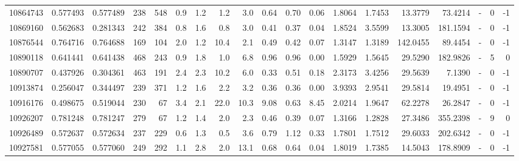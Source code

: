 \begin{tabular}{rrrrrrrrrrrrrrrrlrr}
  10864743 & 0.577493 &   0.577489 &  238 &  548 &      0.9 &      1.2 &     1.2 &      3.0 &       0.64 &        0.70 &        0.06 &  1.8064 &  1.7453 &   13.3779 &   73.4214 &             - &        0 &         -1 \\
  10869160 & 0.562683 &   0.281343 &  242 &  384 &      0.8 &      1.6 &     0.8 &      3.0 &       0.41 &        0.37 &        0.04 &  1.8524 &  3.5599 &   13.3005 &  181.1594 &             - &        0 &         -1 \\
  10876544 & 0.764716 &   0.764688 &  169 &  104 &      2.0 &      1.2 &    10.4 &      2.1 &       0.49 &        0.42 &        0.07 &  1.3147 &  1.3189 &  142.0455 &   89.4454 &             - &        0 &         -1 \\
  10890118 & 0.641441 &   0.641438 &  468 &  243 &      0.9 &      1.8 &     1.0 &      6.8 &       0.96 &        0.96 &        0.00 &  1.5929 &  1.5645 &   29.5290 &  182.9826 &             - &        5 &          0 \\
  10890707 & 0.437926 &   0.304361 &  463 &  191 &      2.4 &      2.3 &    10.2 &      6.0 &       0.33 &        0.51 &        0.18 &  2.3173 &  3.4256 &   29.5639 &    7.1390 &             - &        0 &         -1 \\
  10913874 & 0.256047 &   0.344497 &  239 &  371 &      1.2 &      1.6 &     2.2 &      3.2 &       0.36 &        0.36 &        0.00 &  3.9393 &  2.9541 &   29.5814 &   19.4951 &             - &        0 &         -1 \\
  10916176 & 0.498675 &   0.519044 &  230 &   67 &      3.4 &      2.1 &    22.0 &     10.3 &       9.08 &        0.63 &        8.45 &  2.0214 &  1.9647 &   62.2278 &   26.2847 &             - &        0 &         -1 \\
  10926207 & 0.781248 &   0.781247 &  279 &   67 &      1.2 &      1.4 &     2.0 &      2.3 &       0.46 &        0.39 &        0.07 &  1.3166 &  1.2828 &   27.3486 &  355.2398 &             - &        9 &          0 \\
  10926489 & 0.572637 &   0.572634 &  237 &  229 &      0.6 &      1.3 &     0.5 &      3.6 &       0.79 &        1.12 &        0.33 &  1.7801 &  1.7512 &   29.6033 &  202.6342 &             - &        0 &         -1 \\
  10927581 & 0.577055 &   0.577060 &  249 &  292 &      1.1 &      2.8 &     2.0 &     13.1 &       0.68 &        0.64 &        0.04 &  1.8019 &  1.7385 &   14.5043 &  178.8909 &             - &        0 &         -1 \\

\end{tabular}
